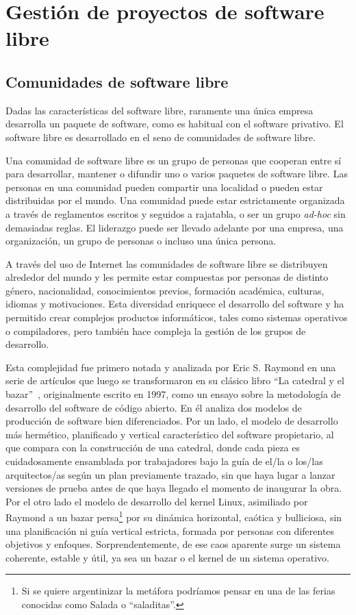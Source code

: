 \chapter{Gestión de proyectos de software libre}

\section{Comunidades de software libre}

Dadas las características del software libre, raramente una única empresa desarrolla un paquete de software, como es habitual con el software privativo. El software libre es desarrollado en el seno de comunidades de software libre.

Una comunidad de software libre es un grupo de personas que cooperan entre sí para desarrollar, mantener o difundir uno o varios paquetes de software libre. Las personas en una comunidad pueden compartir una localidad o pueden estar distribuidas por el mundo. Una comunidad puede estar estrictamente organizada a través de reglamentos escritos y seguidos a rajatabla, o ser un grupo \emph{ad-hoc} sin demasiadas reglas. El liderazgo puede ser llevado adelante por una empresa, una organización, un grupo de personas o incluso una única persona.

A través del uso de Internet las comunidades de software libre se distribuyen alrededor del mundo y les permite estar compuestas por personas de distinto género, nacionalidad, conocimientos previos, formación académica, culturas, idiomas y motivaciones. Esta diversidad enriquece el desarrollo del software y ha permitido crear complejos productos informáticos, tales como sistemas operativos o compiladores, pero también hace compleja la gestión de los grupos de desarrollo.

Esta complejidad fue primero notada y analizada por Eric S. Raymond en una serie de artículos que luego se transformaron en su clásico libro ``La catedral y el bazar''~\cite{raymond01}, originalmente escrito en 1997, como un ensayo sobre la metodología de desarrollo del software de código abierto. En él analiza dos modelos de producción de software bien diferenciados. Por un lado, el modelo de desarrollo más hermético, planificado y vertical característico del software propietario, al que compara con la construcción de una catedral, donde cada pieza es cuidadosamente ensamblada por trabajadores bajo la guía de el/la o los/las arquitectos/as según un plan previamente trazado, sin que haya lugar a lanzar versiones de prueba antes de que haya llegado el momento de inaugurar la obra. Por el otro lado el modelo de desarrollo del kernel Linux, asimiliado por Raymond a un bazar persa\footnote{Si se quiere argentinizar la metáfora podríamos pensar en una de las ferias conocidas como Salada o ``saladitas''.} por su dinámica horizontal, caótica y bulliciosa, sin una planificación ni guía vertical estricta, formada por personas con diferentes objetivos y enfoques. Sorprendentemente, de ese caos aparente surge un sistema coherente, estable y útil, ya sea un bazar o el kernel de un sistema operativo. 

